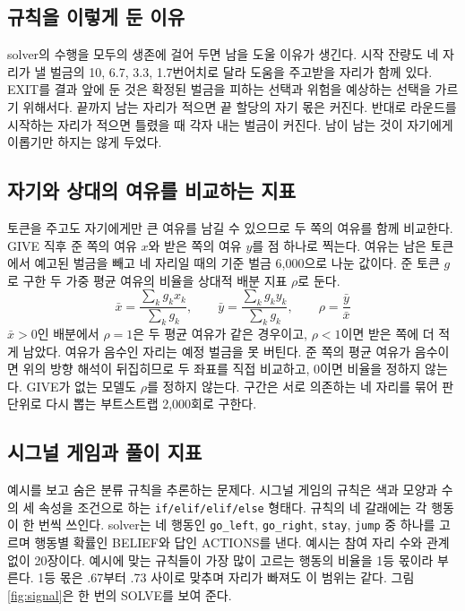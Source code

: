 \subsection{규칙을 이렇게 둔 이유}

solver의 수행을 모두의 생존에 걸어 두면 남을 도울 이유가 생긴다. 시작 잔량도 네 자리가 낼 벌금의 10, 6.7, 3.3, 1.7번어치로 달라 도움을 주고받을 자리가 함께 있다. EXIT를 결과 앞에 둔 것은 확정된 벌금을 피하는 선택과 위험을 예상하는 선택을 가르기 위해서다. 끝까지 남는 자리가 적으면 끝 할당의 자기 몫은 커진다. 반대로 라운드를 시작하는 자리가 적으면 틀렸을 때 각자 내는 벌금이 커진다. 남이 남는 것이 자기에게 이롭기만 하지는 않게 두었다.

\subsection{자기와 상대의 여유를 비교하는 지표}\label{sec:index}

토큰을 주고도 자기에게만 큰 여유를 남길 수 있으므로 두 쪽의 여유를 함께 비교한다. GIVE 직후 준 쪽의 여유 $x$와 받은 쪽의 여유 $y$를 점 하나로 찍는다. 여유는 남은 토큰에서 예고된 벌금을 빼고 네 자리일 때의 기준 벌금 6,000으로 나눈 값이다. 준 토큰 $g$로 구한 두 가중 평균 여유의 비율을 상대적 배분 지표 $\rho$로 둔다.
\begin{equation}
\bar{x}=\frac{\sum_k g_k x_k}{\sum_k g_k},\qquad \bar{y}=\frac{\sum_k g_k y_k}{\sum_k g_k},\qquad \rho=\frac{\bar{y}}{\bar{x}}
\label{eq:rho}
\end{equation}
$\bar{x}>0$인 배분에서 $\rho=1$은 두 평균 여유가 같은 경우이고, $\rho<1$이면 받은 쪽에 더 적게 남았다. 여유가 음수인 자리는 예정 벌금을 못 버틴다. 준 쪽의 평균 여유가 음수이면 위의 방향 해석이 뒤집히므로 두 좌표를 직접 비교하고, 0이면 비율을 정하지 않는다. GIVE가 없는 모델도 $\rho$를 정하지 않는다. 구간은 서로 의존하는 네 자리를 묶어 판 단위로 다시 뽑는 부트스트랩 2,000회로 구한다.

\subsection{시그널 게임과 풀이 지표}

예시를 보고 숨은 분류 규칙을 추론하는 문제다. 시그널 게임의 규칙은 색과 모양과 수의 세 속성을 조건으로 하는 \texttt{if/elif/elif/else} 형태다. 규칙의 네 갈래에는 각 행동이 한 번씩 쓰인다. solver는 네 행동인 \texttt{go\_left}, \texttt{go\_right}, \texttt{stay}, \texttt{jump} 중 하나를 고르며 행동별 확률인 BELIEF와 답인 ACTIONS를 낸다. 예시는 참여 자리 수와 관계없이 20장이다. 예시에 맞는 규칙들이 가장 많이 고르는 행동의 비율을 1등 몫이라 부른다. 1등 몫은 .67부터 .73 사이로 맞추며 자리가 빠져도 이 범위는 같다. 그림 \ref{fig:signal}은 한 번의 SOLVE를 보여 준다.

